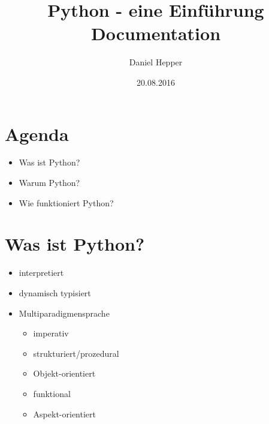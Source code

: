 \documentclass[letterpaper,10pt,ngerman]{sphinxmanual}
\title{Python - eine Einführung Documentation}
\date{20.08.2016}
\author{Daniel Hepper}
\begin{document}
\maketitle
\tableofcontents
{}\label{index::doc}



\chapter{Agenda}
\label{index:einfuhrung-in-python}\label{index:agenda}\begin{itemize}
\item {} 
Was ist Python?

\item {} 
Warum Python?

\item {} 
Wie funktioniert Python?

\end{itemize}


\chapter{Was ist Python?}
\label{index:was-ist-python}\begin{itemize}
\item {} 
interpretiert

\item {} 
dynamisch typisiert

\item {} 
Multiparadigmensprache
\begin{itemize}
\item {} 
imperativ

\item {} 
strukturiert/prozedural

\item {} 
Objekt-orientiert

\item {} 
funktional

\item {} 
Aspekt-orientiert

\end{itemize}

\end{itemize}
\end{document}
